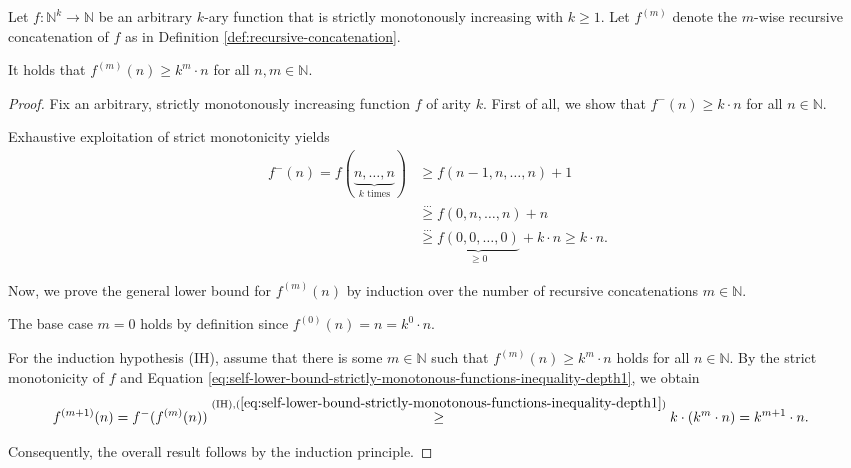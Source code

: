 \begin{lemma}
	\label{lemma:self-lower-bound-strictly-monotonous-functions}
	Let $f:\mathbb{N}^{k}\to\mathbb{N}$ be an arbitrary $k$-ary function that is strictly monotonously increasing with $k\geq 1$.
	Let $f^{(m)}$ denote the $m$-wise recursive concatenation of $f$ as in Definition \ref{def:recursive-concatenation}. 
	
	It holds that $f^{(m)}(n)\geq k^m\cdot n$ for all $n,m\in\mathbb{N}$.
\end{lemma}
\begin{proof}
	Fix an arbitrary, strictly monotonously increasing function $f$ of arity $k$.
	First of all, we show that $f^{-}(n)\geq k\cdot n $ for all $n\in\mathbb{N}$.
	
	Exhaustive exploitation of strict monotonicity yields
	\begin{align}
		f^{-}(n)=f(\underbrace{n,\dots,n}_{k \text{ times}})&\geq f(n-1,n,\dots,n)+1\\
		&\overset{\dots}{\geq} f(0,n,\dots,n)+n \\
		&\overset{\dots}{\geq} \underbrace{f(0,0,\dots,0)}_{\geq 0}+k\cdot n \geq k\cdot n.
		\label{eq:self-lower-bound-strictly-monotonous-functions-inequality-depth1}
	\end{align} 
	
	Now, we prove the general lower bound for $f^{(m)}(n)$ by induction over the number of recursive concatenations $m\in\mathbb{N}$.
	
	The base case $m=0$ holds by definition since $f^{(0)}(n)=n=k^0\cdot n$.
	
	For the induction hypothesis (IH), assume that there is some $m\in\mathbb{N}$ such that $f^{(m)}(n)\geq k^m\cdot n$ holds for all $n\in\mathbb{N}$.
	By the strict monotonicity of $f$ and Equation \ref{eq:self-lower-bound-strictly-monotonous-functions-inequality-depth1}, we obtain
	\begin{align}
		\label{eq:self-lower-bound-strictly-monotonous-functions-inequality-induction-step}
		f^{(m+1)}(n)&=f^{-}(f^{(m)}(n)) \overset{\text{(IH)},(\ref{eq:self-lower-bound-strictly-monotonous-functions-inequality-depth1})}{\geq} k\cdot \left(k^m\cdot n \right) = k^{m+1} \cdot n. 
	\end{align}
	
	Consequently, the overall result follows by the induction principle.
\end{proof}

